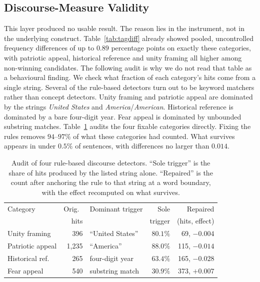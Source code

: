 \documentclass[pdflatex,sn-mathphys-num]{sn-jnl}%
\begin{document}
\subsection{Discourse-Measure Validity}
\label{sec:method:discourse}

This layer produced no usable result. The reason lies in the instrument,
not in the underlying construct. Table~\ref{tab:tagdiff} already
showed pooled, uncontrolled frequency differences of up to $0.89$
percentage points on exactly these categories, with patriotic appeal,
historical reference and unity framing all higher among non-winning
candidates. The following audit is why we do not read that table as a
behavioural finding. We check what fraction of each category's hits come
from a single string. Several of the rule-based detectors turn out to be
keyword matchers rather than concept detectors. Unity framing and patriotic
appeal are dominated by the strings \emph{United States} and
\emph{America}/\emph{American}. Historical reference is dominated by a bare
four-digit year. Fear appeal is dominated by unbounded substring matches.
Table~\ref{tab:ruleaudit} audits the four fixable categories directly.
Fixing the rules removes $94$--$97\%$ of what these categories had counted.
What survives appears in under $0.5\%$ of sentences, with differences no
larger than $0.014$.

\begin{table}[t]
\caption{Audit of four rule-based discourse detectors. ``Sole trigger'' is
the share of hits produced by the listed string alone. ``Repaired'' is the
count after anchoring the rule to that string at a word boundary, with the
effect recomputed on what survives.}
\label{tab:ruleaudit}
\centering
\footnotesize
\setlength{\tabcolsep}{3pt}
\begin{tabular}{lrlrr}
\toprule
Category & Orig.\ & Dominant trigger & Sole & Repaired \\
         & hits   &                  & trigger & (hits, effect) \\
\midrule
Unity framing    & 396   & ``United States''  & $80.1\%$ & 69, $-0.004$ \\
Patriotic appeal & 1{,}235 & ``America''      & $88.0\%$ & 115, $-0.014$ \\
Historical ref.\ & 265   & four-digit year    & $63.4\%$ & 165, $-0.028$ \\
Fear appeal      & 540   & substring match    & $30.9\%$ & 373, $+0.007$ \\
\bottomrule
\end{tabular}
\end{table}
\end{document}
